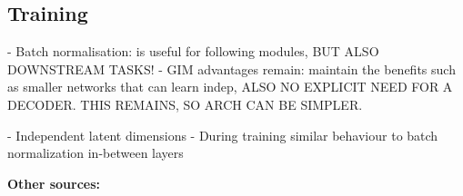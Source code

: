 \subsection{Training}
	- Batch normalisation: is useful for following modules, BUT ALSO DOWNSTREAM TASKS!
	- GIM advantages remain: maintain the benefits such as smaller networks that can learn indep, ALSO NO EXPLICIT NEED FOR A DECODER. THIS REMAINS, SO ARCH CAN BE SIMPLER.
	

	- Independent latent dimensions
	- During training similar behaviour to batch normalization in-between layers





\textbf{Other sources:} \\











%


